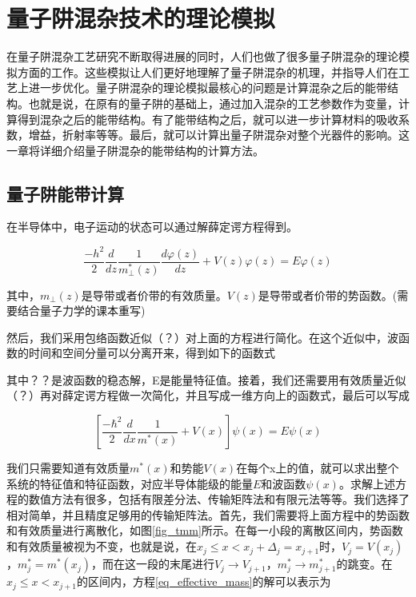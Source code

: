 \documentclass{ZJUthesis}
\begin{document}
\chapter{量子阱混杂技术的理论模拟}

在量子阱混杂工艺研究不断取得进展的同时，人们也做了很多量子阱混杂的理论模拟方面的工作。这些模拟让人们更好地理解了量子阱混杂的机理，并指导人们在工艺上进一步优化。量子阱混杂的理论模拟最核心的问题是计算混杂之后的能带结构。也就是说，在原有的量子阱的基础上，通过加入混杂的工艺参数作为变量，计算得到混杂之后的能带结构。有了能带结构之后，就可以进一步计算材料的吸收系数，增益，折射率等等。最后，就可以计算出量子阱混杂对整个光器件的影响。这一章将详细介绍量子阱混杂的能带结构的计算方法。

\section{量子阱能带计算}

在半导体中，电子运动的状态可以通过解薛定谔方程得到。

\begin{equation}
    \label{schrodinger}
    \frac{-h^2}{2} \frac{d}{dz} \frac{1}{m_\perp^*(z)} \frac{d\varphi(z)}{dz}
    +V(z)\varphi(z)
        = E\varphi(z)
\end{equation}

其中，$m_\perp(z)$是导带或者价带的有效质量。$V(z)$是导带或者价带的势函数。(需要结合量子力学的课本重写)

然后，我们采用包络函数近似（？）对上面的方程进行简化。在这个近似中，波函数的时间和空间分量可以分离开来，得到如下的函数式

其中？？是波函数的稳态解，E是能量特征值。接着，我们还需要用有效质量近似（？）再对薛定谔方程做一次简化，并且写成一维方向上的函数式，最后可以写成

\begin{equation}
    \label{eq_effective_mass}
    \left[ \frac{-\hbar^2}{2} \frac{d}{dx} \frac{1}{m^*(x)} + V(x) \right] \psi(x) = E \psi(x)
\end{equation}

我们只需要知道有效质量$m^*(x)$和势能$V(x)$在每个x上的值，就可以求出整个系统的特征值和特征函数，对应半导体能级的能量$E$和波函数$\psi(x)$。求解上述方程的数值方法有很多，包括有限差分法、传输矩阵法和有限元法等等。我们选择了相对简单，并且精度足够用的传输矩阵法。首先，我们需要将上面方程中的势函数和有效质量进行离散化，如图\ref{fig_tmm}所示。在每一小段的离散区间内，势函数和有效质量被视为不变，也就是说，在$x_j\le x<x_j+\Delta_j=x_{j+1}$时，$V_j=V(x_j)$，$m^*_j=m^*(x_j)$，而在这一段的末尾进行$V_j\to V_{j+1}$，$m^*_j\to m^*_{j+1}$的跳变。在$x_j\le x<x_{j+1}$的区间内，方程\ref{eq_effective_mass}的解可以表示为
\end{document}
